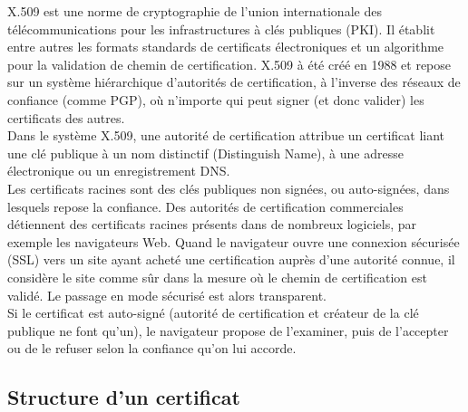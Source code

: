 X.509 est une norme de cryptographie de l'union internationale des télécommunications pour les infrastructures à clés publiques (PKI). Il établit entre autres les formats standards de certificats électroniques et un algorithme pour la validation de chemin de certification. X.509 à été créé en 1988  et repose sur un système hiérarchique d'autorités de certification, à l'inverse des réseaux de confiance (comme PGP), où n'importe qui peut signer (et donc valider) les certificats des autres.\\

Dans le système X.509, une autorité de certification attribue un certificat liant une clé publique à un nom distinctif (Distinguish Name), à une adresse électronique ou un enregistrement DNS.\\

Les certificats racines sont des clés publiques non signées, ou auto-signées, dans lesquels repose la confiance. Des autorités de certification commerciales détiennent des certificats racines présents dans de nombreux logiciels, par exemple les navigateurs Web. Quand le navigateur ouvre une connexion sécurisée (SSL) vers un site ayant acheté une certification auprès d'une autorité connue, il considère le site comme sûr dans la mesure où le chemin de certification est validé. Le passage en mode sécurisé est alors transparent.\\

Si le certificat est auto-signé (autorité de certification et créateur de la clé publique ne font qu'un), le navigateur propose de l'examiner, puis de l'accepter ou de le refuser selon la confiance qu'on lui accorde.\\

\subsection{Structure d'un certificat}

